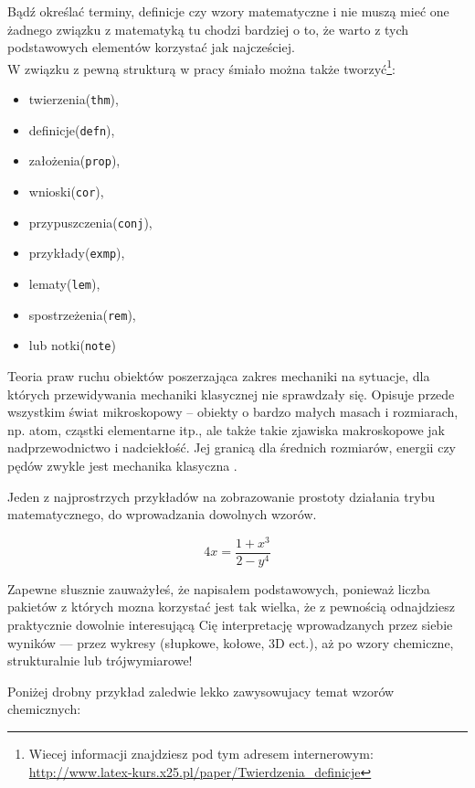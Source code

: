 Bądź określać terminy, definicje czy wzory matematyczne i nie muszą mieć one żadnego związku z matematyką tu chodzi bardziej o to, że warto z tych podstawowych elementów korzystać jak najcześciej.\\

W związku z pewną strukturą w pracy śmiało można także tworzyć\footnote{Wiecej informacji znajdziesz pod tym adresem internerowym: \url{http://www.latex-kurs.x25.pl/paper/Twierdzenia_definicje}}:

\begin{itemize}
\item twierzenia(\texttt{thm}),
\item definicje(\texttt{defn}),
\item założenia(\texttt{prop}),
\item wnioski(\texttt{cor}),
\item przypuszczenia(\texttt{conj}),
\item przykłady(\texttt{exmp}),
\item lematy(\texttt{lem}),
\item spostrzeżenia(\texttt{rem}),
\item lub notki(\texttt{note})
\end{itemize}

\begin{defn}
Teoria praw ruchu obiektów poszerzająca zakres mechaniki na sytuacje, dla których przewidywania mechaniki klasycznej nie sprawdzały się. Opisuje przede wszystkim świat mikroskopowy – obiekty o bardzo małych masach i rozmiarach, np. atom, cząstki elementarne itp., ale także takie zjawiska makroskopowe jak nadprzewodnictwo i nadciekłość. Jej granicą dla średnich rozmiarów, energii czy pędów zwykle jest mechanika klasyczna \parencite{url:wiki-mechanika-kwantowa}.
\end{defn}

\noindent Jeden z najprostrzych przykładów na zobrazowanie prostoty działania trybu matematycznego, do wprowadzania dowolnych wzorów.

$$
4 x = \frac{1+x^3}{2-y^4}
$$

Zapewne słusznie zauważyłeś, że napisałem podstawowych, ponieważ liczba pakietów z których mozna korzystać jest tak wielka, że z pewnością odnajdziesz praktycznie dowolnie interesującą Cię interpretację wprowadzanych przez siebie wyników --- przez wykresy (słupkowe, kołowe, 3D ect.), aż po wzory chemiczne, strukturalnie lub trójwymiarowe!

Poniżej drobny przykład zaledwie lekko zawysowujacy temat wzorów chemicznych:
\vspace{.5cm}
\begin{center}
\end{center}
